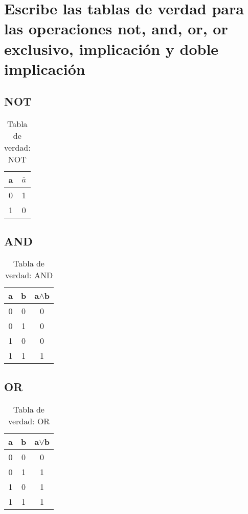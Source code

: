 \section{Escribe las tablas de verdad para las operaciones not, and, or, or exclusivo, implicación y doble implicación}
\subsection{NOT}
\begin{table}[!ht]
    \centering
    \begin{tabular}{|c|c|}
        \hline
        a & $\overline{a}$\\
        \hline
        0 & 1 \\
        \hline
        1 & 0 \\
        \hline
    \end{tabular}
    \caption{Tabla de verdad: NOT}\label{table:not}
\end{table}

\subsection{AND}
\begin{table}[!ht]
    \centering
    \begin{tabular}{|c|c|c|}
        \hline
        a & b & a$\wedge$b\\
        \hline
        0 & 0 & 0 \\
        \hline
        0 & 1 & 0 \\
        \hline
        1 & 0 & 0 \\
        \hline
        1 & 1 & 1 \\
        \hline
    \end{tabular}
    \caption{Tabla de verdad: AND}\label{table:and}
\end{table}

\subsection{OR}
\begin{table}[!ht]
    \centering
    \begin{tabular}{|c|c|c|}
        \hline
        a & b & a$\vee$b\\
        \hline
        0 & 0 & 0 \\
        \hline
        0 & 1 & 1 \\
        \hline
        1 & 0 & 1 \\
        \hline
        1 & 1 & 1 \\
        \hline
    \end{tabular}
    \caption{Tabla de verdad: OR}\label{table:or}
\end{table}

